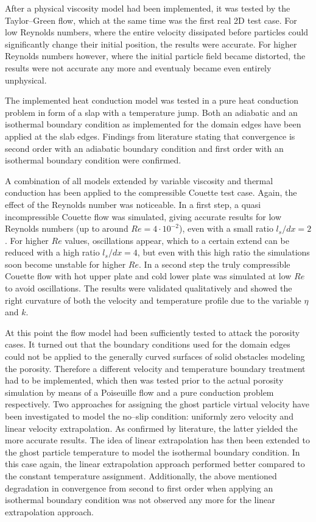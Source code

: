\documentclass[11pt,a4paper,twoside]{report}
\begin{document}
After a physical viscosity model had been implemented, it was tested by the Taylor--Green flow, which at the same time was the first real 2D %
test case. For low Reynolds numbers, where the entire velocity dissipated before particles could significantly change their initial position, the results were accurate. For higher Reynolds numbers however, where the initial particle field became distorted, the results were not accurate any more and eventualy became even entirely unphysical.

The implemented heat conduction model was tested in a pure heat conduction problem in form of a slap with a temperature jump. Both an adiabatic and an isothermal boundary condition as implemented for the domain edges have been applied at the slab edges.
Findings from literature stating that convergence is second order with an adiabatic boundary condition and first order with an isothermal boundary condition were confirmed.

A combination of all models extended by variable viscosity and thermal conduction has been applied to the compressible Couette test case. Again, the effect of the Reynolds number was noticeable. In a first step, a quasi incompressible Couette flow was simulated, giving accurate results for low Reynolds numbers (up to around $Re=4\cdot10^{-2}$), even with a small ratio $l_s/dx=2$. For higher $Re$ values, oscillations appear, which to a certain extend can be reduced with a high ratio $l_s/dx=4$, but even with this high ratio the simulations soon become unstable for higher $Re$. In a second step the truly compressible Couette flow with hot upper plate and cold lower plate was simulated at low $Re$ to avoid oscillations. The results were validated qualitatively and showed the right curvature of both the velocity and temperature profile due to the variable $\eta$ and $k$.

At this point the flow model had been sufficiently tested to attack the porosity cases. It turned out that the boundary conditions used for the domain edges could not be applied to the generally curved surfaces of solid obstacles modeling the porosity. Therefore a different velocity and temperature boundary treatment had to be implemented,  which then was tested prior to the actual porosity simulation by means of a Poiseuille flow and a pure conduction problem respectively. Two approaches for assigning the ghost particle virtual velocity have been investigated to model the no--slip condition: uniformly zero velocity and linear velocity extrapolation. As confirmed by literature, the latter yielded the more accurate results. The idea of linear extrapolation has then been extended to the ghost particle temperature to model the isothermal boundary condition. In this case again, the linear extrapolation approach performed better compared to the constant temperature assignment. Additionally, the above mentioned degradation in convergence from second to first order when applying an isothermal boundary condition was not observed any more for the linear extrapolation approach.
\end{document}
